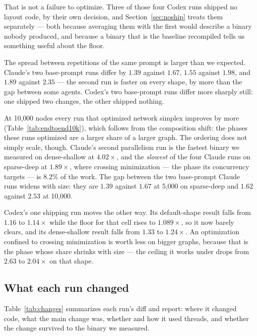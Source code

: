 That is not a failure to optimize. Three of those four Codex runs shipped no
layout code, by their own decision, and Section~\ref{sec:noship} treats them
separately --- both because averaging them with the first would describe a
binary nobody produced, and because a binary that is the baseline recompiled
tells us something useful about the floor.

The spread between repetitions of the same prompt is larger than we expected.
Claude's two base-prompt runs differ by $1.39$ against $1.67$, $1.55$ against
$1.98$, and $1.89$ against $2.35$ --- the second run is faster on every shape,
by more than the gap between some agents. Codex's two base-prompt runs differ
more sharply still: one shipped two changes, the other shipped nothing.

At 10{,}000 nodes every run that optimized network simplex improves by more
(Table~\ref{tab:endtoend10k}), which follows from the composition shift: the
phases these runs optimized are a larger share of a larger graph. The ordering
does not simply scale, though. Claude's second parallelism run is the fastest
binary we measured on dense-shallow at $4.02\times$, and the \emph{slowest} of
the four Claude runs on sparse-deep at $1.89\times$, where crossing
minimization --- the phase its concurrency targets --- is $8.2\%$ of the work.
The gap between the two base-prompt Claude runs widens with size: they are $1.39$
against $1.67$ at 5{,}000 on sparse-deep and $1.62$ against $2.53$ at
10{,}000.

Codex's one shipping run moves the other way. Its default-shape result falls
from $1.16$ to $1.14\times$ while the floor for that cell rises to
$1.089\times$, so it now barely clears, and its dense-shallow result falls from
$1.33$ to $1.24\times$. An optimization confined to crossing minimization is
worth less on bigger graphs, because that is the phase whose share shrinks with
size --- the ceiling it works under drops from $2.63$ to $2.04\times$ on that
shape.

\subsection{What each run changed}
\label{sec:changes}

Table~\ref{tab:changes} summarizes each run's diff and report: where it
changed code, what the main change was, whether and how it used threads, and
whether the change survived to the binary we measured.

